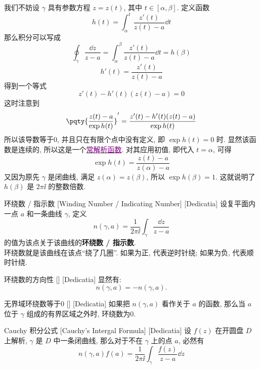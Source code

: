\documentclass[UTF8]{ctexart}
\newcommand{\hyperrefc}[2]{\hyperref[#1]{\textcolor{purple}{#2}}}
\begin{document}
        \begin{prf}
            我们不妨设 \(\gamma\) 具有参数方程 \(z=z(t)\), 其中 \(t\in[\alpha,\beta]\). 定义函数
            \[h(t)=\int_\alpha^t \frac{z'(t)}{z(t)-a}\dd{t}\]
            那么积分可以写成
            \[\oint_\gamma\frac{\dd{z}}{z-a}=\int_\alpha^\beta \frac{z'(t)}{z(t)-a}\dd{t}=h(\beta)\]
            \[h'(t)=\frac{z'(t)}{z(t)-a}\]
            得到一个等式
            \[z'(t)-h'(t)(z(t)-a)=0\]
            这时注意到
            \[\pqty{\frac{z(t)-a}{\exp h(t)}}'=\frac{z'(t)-h'(t)(z(t)-a)}{\exp h(t)}\]
            所以该导数等于0, 并且只在有限个点中没有定义, 即 \(\exp h(t)=0\) 时. 显然该函数是连续的, 所以这是一个\hyperrefc{ppt:TrivialAnalyticalFunction}{常解析函数}. 对其应用初值, 即代入 \(t=\alpha\), 可得
            \[\exp h(t)=\frac{z(t)-a}{z(\alpha)-a}\]
            又因为原先 \(\gamma\) 是闭曲线, 满足 \(z(\alpha)=z(\beta)\), 所以 \(\exp h(\beta)=1\). 这就说明了 \(h(\beta)\) 是 \(2\pi\ii\) 的整数倍数. 
        \end{prf}

        \begin{dfn}
            [WindingNumber]
            {环绕数 / 指示数}
            [Winding Number / Indicating Number]
            [Dedicatia]
            设复平面内一点 \(a\) 和一条曲线 \(\gamma\), 定义
            \[n(\gamma, a)=\frac{1}{2\pi\ii}\int_\gamma\frac{\dd{z}}{z-a}\]
            的值为该点关于该曲线的\textbf{环绕数 / 指示数}.\\
            环绕数就是该曲线在该点“绕了几圈”. 如果为正, 代表逆时针绕; 如果为负, 代表顺时针绕. 
        \end{dfn}

        \begin{ppt}
            [UUID]
            {环绕数的方向性}
            []
            [Dedicatia]
            显然有: 
            \[n(\gamma,a)=-n(\gamma,a).\]
        \end{ppt}

        \begin{ppt}
            [UUID]
            {无界域环绕数等于0}
            []
            [Dedicatia]
            如果把 \(n(\gamma,a)\) 看作关于 \(a\) 的函数, 那么当 \(a\) 位于 \(\gamma\) 组成的有界区域之外时, 环绕数为0.
        \end{ppt}

        \begin{thm}
            [UUID]
            {Cauchy 积分公式}
            [Cauchy's Intergal Formula]
            [Dedicatia]
            设 \(f(z)\) 在开圆盘 \(D\) 上解析,  \(\gamma\) 是 \(D\) 中一条闭曲线, 那么对于不在 \(\gamma\) 上的点 \(a\), 必然有
            \[n(\gamma,a)f(a)=\frac{1}{2\pi\ii}\int_\gamma\frac{f(z)}{z-a}\dd{z} \]
        \end{thm}
\end{document}
